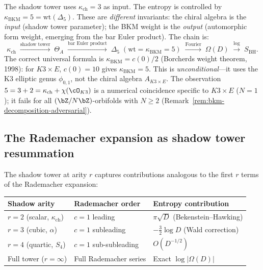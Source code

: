 \begin{warning}
\label{warn:k3e-kappa-entropy}
The shadow tower uses $\kappa_{\mathrm{ch}} = 3$ as input. The entropy is controlled by $\kappa_{\mathrm{BKM}} = 5 = \mathrm{wt}(\Delta_5)$. These are \emph{different} invariants: the chiral algebra is the \emph{input} (shadow tower parameter); the BKM weight is the \emph{output} (automorphic form weight, emerging from the bar Euler product). The chain is:
\[
 \kappa_{\mathrm{ch}} \;\xrightarrow{\text{shadow tower}}\; \Theta_A \;\xrightarrow{\text{bar Euler product}}\; \Delta_5 \;(\mathrm{wt} = \kappa_{\mathrm{BKM}} = 5) \;\xrightarrow{\text{Fourier}}\; \Omega(D) \;\xrightarrow{\log}\; S_{\mathrm{BH}}.
\]
The correct universal formula is $\kappa_{\mathrm{BKM}} = c(0)/2$ (Borcherds weight theorem, 1998): for $K3 \times E$, $c(0) = 10$ gives $\kappa_{\mathrm{BKM}} = 5$. This is \emph{unconditional}---it uses the K3 elliptic genus $\phi_{0,1}$, not the chiral algebra $A_{K3 \times E}$.  The observation $5 = 3 + 2 = \kappa_{\mathrm{ch}} + \chi(\cO_{K3})$ is a numerical coincidence specific to $K3 \times E$ ($N = 1$); it fails for all $(\bZ/N\bZ)$-orbifolds with $N \ge 2$ (Remark~\ref{rem:bkm-decomposition-adversarial}).
\end{warning}

\subsection{The Rademacher expansion as shadow tower resummation}
\label{subsec:k3e-shadow-rademacher}

The shadow tower at arity $r$ captures contributions analogous to the first $r$ terms of the Rademacher expansion:

\begin{center}
\renewcommand{\arraystretch}{1.3}
\begin{tabular}{@{}lll@{}}
\textbf{Shadow arity} & \textbf{Rademacher order} & \textbf{Entropy contribution} \\ \hline
$r = 2$ (scalar, $\kappa_{\mathrm{ch}}$) & $c = 1$ leading & $\pi\sqrt{D}$ (Bekenstein--Hawking) \\
$r = 3$ (cubic, $\alpha$) & $c = 1$ subleading & $-\frac{3}{2}\log D$ (Wald correction) \\
$r = 4$ (quartic, $S_4$) & $c = 1$ sub-subleading & $O(D^{-1/2})$ \\
Full tower ($r = \infty$) & Full Rademacher series & Exact $\log|\Omega(D)|$ \\
\end{tabular}
\end{center}

